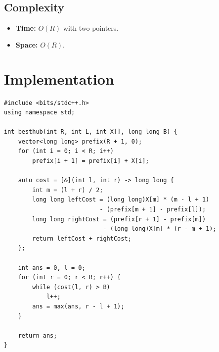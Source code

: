 \documentclass[11pt,a4paper]{article}
\begin{document}
\subsection{Complexity}
\begin{itemize}
    \item \textbf{Time:} $O(R)$ with two pointers.
    \item \textbf{Space:} $O(R)$.
\end{itemize}

\section{Implementation}

\begin{lstlisting}
#include <bits/stdc++.h>
using namespace std;

int besthub(int R, int L, int X[], long long B) {
    vector<long long> prefix(R + 1, 0);
    for (int i = 0; i < R; i++)
        prefix[i + 1] = prefix[i] + X[i];

    auto cost = [&](int l, int r) -> long long {
        int m = (l + r) / 2;
        long long leftCost = (long long)X[m] * (m - l + 1)
                           - (prefix[m + 1] - prefix[l]);
        long long rightCost = (prefix[r + 1] - prefix[m])
                            - (long long)X[m] * (r - m + 1);
        return leftCost + rightCost;
    };

    int ans = 0, l = 0;
    for (int r = 0; r < R; r++) {
        while (cost(l, r) > B)
            l++;
        ans = max(ans, r - l + 1);
    }

    return ans;
}
\end{lstlisting}
\end{document}
